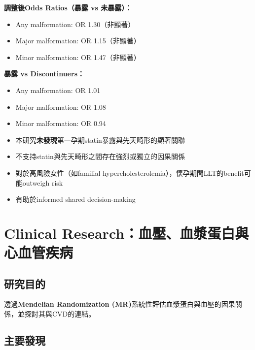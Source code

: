 \documentclass[12pt,a4paper]{article}
\begin{document}
\textbf{調整後Odds Ratios（暴露 vs 未暴露）：}
\begin{itemize}
    \item Any malformation: OR 1.30（非顯著）
    \item Major malformation: OR 1.15（非顯著）
    \item Minor malformation: OR 1.47（非顯著）
\end{itemize}

\textbf{暴露 vs Discontinuers：}
\begin{itemize}
    \item Any malformation: OR 1.01
    \item Major malformation: OR 1.08
    \item Minor malformation: OR 0.94
\end{itemize}

\begin{tcolorbox}[colback=emergency_blue!5!white,colframe=emergency_blue,title=\textbf{臨床意義}]
\begin{itemize}
    \item 本研究\textbf{未發現}第一孕期statin暴露與先天畸形的顯著關聯
    \item 不支持statin與先天畸形之間存在強烈或獨立的因果關係
    \item 對於高風險女性（如familial hypercholesterolemia），懷孕期間LLT的benefit可能outweigh risk
    \item 有助於informed shared decision-making
\end{itemize}
\end{tcolorbox}

\section{Clinical Research：血壓、血漿蛋白與心血管疾病}

\subsection{研究目的}

透過\textbf{Mendelian Randomization (MR)}系統性評估血漿蛋白與血壓的因果關係，並探討其與CVD的連結。

\subsection{主要發現}
\end{document}
